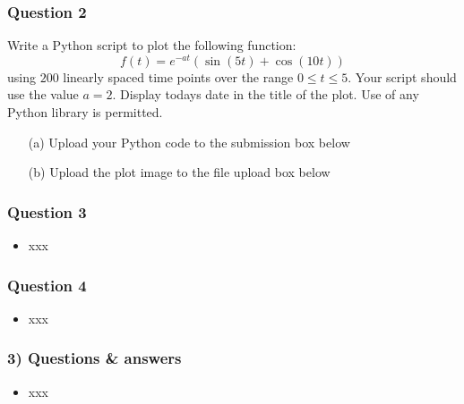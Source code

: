\documentclass[english,14pt]{beamer}
\begin{document}

\begin{frame}[fragile]

\frametitle{Question 2}

Write a Python script to plot the following function:
\[
f(t) = e^{-at}\left( \sin(5t) + \cos(10t)\right)
\]
using $200$ linearly spaced time points over the range $0 \leq t \leq 5$. Your script should use the value $a = 2$. Display todays date in the title of the plot. Use of any Python library is permitted.

\begin{itemize}
\item[(a)] Upload your Python code to the submission box below
\item[(b)] Upload the plot image to the file upload box below
\end{itemize}

\end{frame}


\begin{frame}[fragile]

\frametitle{Question 3}

\begin{itemize}
	\item xxx
\end{itemize}

\end{frame}


\begin{frame}[fragile]

\frametitle{Question 4}

\begin{itemize}
	\item xxx
\end{itemize}

\end{frame}


\begin{frame}[fragile]

\frametitle{3) Questions \& answers}

\begin{itemize}
	\item xxx
\end{itemize}

\end{frame}
\end{document}
